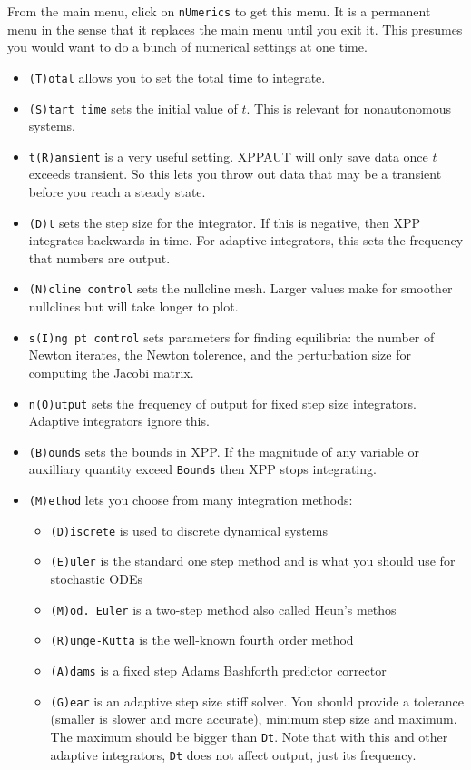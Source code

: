 \documentclass{article}
\begin{document}
\bigskip

From the main menu, click on {\tt nUmerics} to get this menu. It is a permanent menu in the sense that it replaces the main menu until you exit it. This presumes you would want to do a bunch of numerical settings at one time.
\begin{itemize}
\item {\tt (T)otal} allows you to set the total time to integrate. 
\item {\tt (S)tart time} sets the initial value of $t$. This is relevant for nonautonomous systems.
\item {\tt t(R)ansient} is a very useful setting. XPPAUT will only save data once $t$ exceeds transient. So this lets you throw out data  that may be a transient before you reach a steady state.
\item {\tt (D)t} sets the step size for the integrator. If this is negative, then XPP integrates backwards in time. For adaptive integrators, this sets the frequency that numbers are output.
\item{\tt (N)cline control} sets the nullcline mesh. Larger values make for smoother nullclines but will take longer to plot.
\item{\tt s(I)ng pt control} sets parameters for finding equilibria: the number of Newton iterates, the Newton tolerence, and the perturbation size for computing the Jacobi matrix.
\item{\tt n(O)utput} sets the frequency of output for fixed step size integrators. Adaptive integrators ignore this.
\item{\tt (B)ounds} sets the bounds in XPP. If the magnitude of any variable or auxilliary quantity exceed {\tt Bounds} then XPP stops integrating.
\item {\tt (M)ethod} lets you choose from many integration methods:
\begin{itemize}
\item {\tt (D)iscrete} is used to discrete dynamical systems
\item {\tt (E)uler} is the standard one step method and is what you should use for stochastic ODEs
\item {\tt (M)od. Euler} is a two-step method also called Heun's methos
\item {\tt (R)unge-Kutta} is the well-known fourth order method
\item {\tt (A)dams} is a fixed step Adams Bashforth predictor corrector
\item {\tt (G)ear} is an adaptive step size stiff solver. You should provide a tolerance (smaller is slower and more accurate), minimum step size and maximum. The maximum should be bigger than {\tt Dt}. Note that with this and other adaptive integrators, {\tt Dt} does not affect output, just its frequency.

\end{itemize}
\end{itemize}
\end{document}
